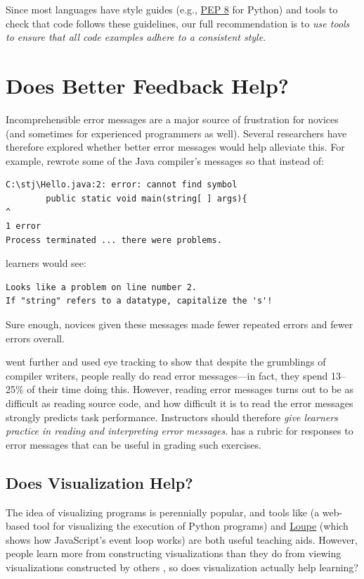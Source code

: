Since most languages have style guides (e.g., \href{https://www.python.org/dev/peps/pep-0008/}{PEP 8} for
Python) and tools to check that code follows these guidelines, our
full recommendation is to \emph{use tools to ensure that all code examples
adhere to a consistent style}.

\section{Does Better Feedback Help?}\label{s:pck-error}

Incomprehensible error messages are a major source of frustration for
novices (and sometimes for experienced programmers as well). Several
researchers have therefore explored whether better error messages would
help alleviate this. For example, \cite{Beck2016} rewrote some of the
Java compiler's messages so that instead of:

\begin{verbatim}
C:\stj\Hello.java:2: error: cannot find symbol
        public static void main(string[ ] args){
^
1 error
Process terminated ... there were problems.
\end{verbatim}

learners would see:

\begin{verbatim}
Looks like a problem on line number 2.
If "string" refers to a datatype, capitalize the 's'!
\end{verbatim}

Sure enough, novices given these messages made fewer repeated errors and
fewer errors overall.

\cite{Bari2017} went further and used eye tracking to show that
despite the grumblings of compiler writers, people really do read error
messages---in fact, they spend 13--25\% of their time doing this. However,
reading error messages turns out to be as difficult as reading source
code, and how difficult it is to read the error messages strongly
predicts task performance. Instructors should therefore \emph{give learners
practice in reading and interpreting error messages}. \cite{Marc2011}
has a rubric for responses to error messages that can be useful in
grading such exercises.

\subsection{Does Visualization Help?}\label{does-visualization-help}

The idea of visualizing programs is perennially popular, and tools
like \cite{Guo2013} (a web-based tool for visualizing the
execution of Python programs) and \href{http://latentflip.com/loupe/}{Loupe} (which shows how
JavaScript's event loop works) are both useful teaching aids.
However, people learn more from constructing visualizations than they
do from viewing visualizations constructed by others
\cite{Stas1998,Ceti2016}, so does visualization actually
help learning?

